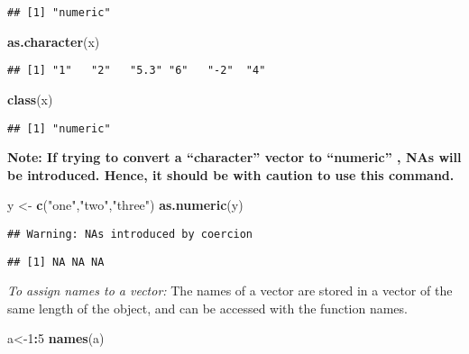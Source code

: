 \documentclass[]{book}
\newenvironment{Shaded}{\begin{snugshade}}{\end{snugshade}}
\newcommand{\KeywordTok}[1]{\textcolor[rgb]{0.13,0.29,0.53}{\textbf{#1}}}
\newcommand{\DecValTok}[1]{\textcolor[rgb]{0.00,0.00,0.81}{#1}}
\newcommand{\StringTok}[1]{\textcolor[rgb]{0.31,0.60,0.02}{#1}}
\newcommand{\OperatorTok}[1]{\textcolor[rgb]{0.81,0.36,0.00}{\textbf{#1}}}
\newcommand{\NormalTok}[1]{#1}
\theoremstyle{definition}
\theoremstyle{definition}
\theoremstyle{definition}
\theoremstyle{remark}
\begin{document}
\begin{verbatim}
## [1] "numeric"
\end{verbatim}

\begin{Shaded}
\begin{Highlighting}[]
\KeywordTok{as.character}\NormalTok{(x)}
\end{Highlighting}
\end{Shaded}

\begin{verbatim}
## [1] "1"   "2"   "5.3" "6"   "-2"  "4"
\end{verbatim}

\begin{Shaded}
\begin{Highlighting}[]
\KeywordTok{class}\NormalTok{(x)}
\end{Highlighting}
\end{Shaded}

\begin{verbatim}
## [1] "numeric"
\end{verbatim}

\textbf{Note: If trying to convert a ``character'' vector to ``numeric''
, NAs will be introduced. Hence, it should be with caution to use this
command.}

\begin{Shaded}
\begin{Highlighting}[]
\NormalTok{y <-}\StringTok{ }\KeywordTok{c}\NormalTok{(}\StringTok{"one"}\NormalTok{,}\StringTok{"two"}\NormalTok{,}\StringTok{"three"}\NormalTok{)}
\KeywordTok{as.numeric}\NormalTok{(y)}
\end{Highlighting}
\end{Shaded}

\begin{verbatim}
## Warning: NAs introduced by coercion
\end{verbatim}

\begin{verbatim}
## [1] NA NA NA
\end{verbatim}

\emph{To assign names to a vector:} The names of a vector are stored in
a vector of the same length of the object, and can be accessed with the
function names.

\begin{Shaded}
\begin{Highlighting}[]
\NormalTok{a<-}\DecValTok{1}\OperatorTok{:}\DecValTok{5}
\KeywordTok{names}\NormalTok{(a)}
\end{Highlighting}
\end{Shaded}
\end{document}
